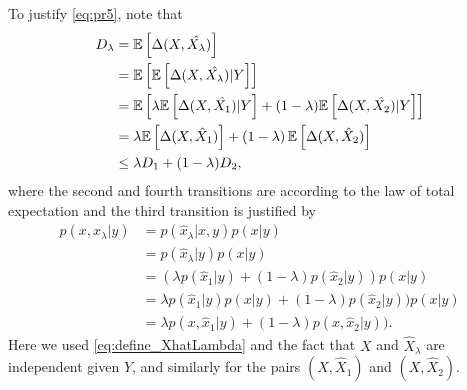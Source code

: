 To justify \eqref{eq:pr5}, note that
\begin{align}
D_\lambda &= \mathbb{E}\left[\Delta(X,\hat{X_\lambda})\right] \nonumber \\
&= \mathbb{E} \left[ \mathbb{E}\left[\Delta(X,\hat{X_\lambda}) \vert Y \right]  \right] \nonumber \\
&= \mathbb{E} \left[ \lambda \mathbb{E}\left[\Delta(X,\hat{X_1}) \vert Y \right] + (1-\lambda) \mathbb{E}\left[ \Delta(X,\hat{X_2}) \vert Y \right]  \right] \nonumber \\
&= \lambda\mathbb{E} \left[ {\Delta(X,\hat{X}_1)} \right]+\left(1-\lambda\right)\mathbb{E} \left[ {\Delta(X,\hat{X}_2)} \right] \nonumber\\
&\le \lambda D_1 + (1-\lambda)D_2,
\end{align}
where the second and fourth transitions are according to the law of total expectation and the third transition is justified by
\begin{align}
p(x,\hat{x}_\lambda | y) &= p(\hat{x}_\lambda | x,y) p(x | y) \nonumber\\
&= p(\hat{x}_\lambda | y) p(x | y) \nonumber\\
&= (\lambda p(\hat{x}_1 | y) + (1-\lambda )p(\hat{x}_2 | y)) p(x | y) \nonumber \\
&= \lambda p(\hat{x}_1 | y) p(x | y) + (1-\lambda )p(\hat{x}_2 | y)) p(x | y) \nonumber\\
&= \lambda p(x,\hat{x}_1 | y) + (1-\lambda )p(x, \hat{x}_2 | y)).
\end{align}
Here we used \eqref{eq:define_XhatLambda} and the fact that $X$ and $\hat{X}_\lambda$ are independent given $Y$, and similarly for the pairs $(X,\hat{X}_1)$ and $(X,\hat{X}_2)$.


